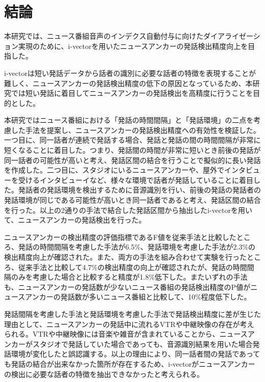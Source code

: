 \chapter{結論}
本研究では、ニュース番組音声のインデクス自動付与に向けたダイアライゼーション実現のために、i-vectorを用いたニュースアンカーの発話検出精度向上を目指した。\par

i-vectorは短い発話データから話者の識別に必要な話者の特徴を表現することが難しく、ニュースアンカーの発話検出精度の低下の原因となっているため、本研究では短い発話に着目してニュースアンカーの発話検出を高精度に行うことを目的とした。\par

本研究ではニュース番組における「発話の時間間隔」と「発話環境」の二点を考慮した手法を提案し、ニュースアンカーの発話検出精度への有効性を検証した。一つ目に、同一話者が連続で発話する場合、発話と発話の間の時間間隔が非常に短くなることに着目した。つまり、発話間の時間が非常に短いとき前後の発話が同一話者の可能性が高いと考え、発話区間の結合を行うことで擬似的に長い発話を作成した。二つ目に、スタジオにいるニュースアンカーや、屋外でインタビューを受けるインタビューイなど、様々な環境で話者が発話していることに着目した。発話者の発話環境を検出するために音源識別を行い、前後の発話の発話者の発話環境が同じである可能性が高いとき同一話者であると考え、発話区間の結合を行った。以上の2通りの手法で結合した発話区間から抽出したi-vectorを用いて、ニュースアンカーの発話検出を行った。\par

ニュースアンカーの検出精度の評価指標であるF値を従来手法と比較したところ、発話の時間間隔を考慮した手法が6.5\%、発話環境を考慮した手法が2.3\%の検出精度向上が確認された。また、両方の手法を組み合わせて実験を行ったところ、従来手法と比較して4.7\%の検出精度の向上が確認されたが、発話の時間間隔のみを考慮した場合と比較すると精度が1.8\%低下した。またいずれの手法も、ニュースアンカーの発話数が少ないニュース番組の発話検出精度のP値がニュースアンカーの発話数が多いニュース番組と比較して、10\%程度低下した。\par

発話間隔を考慮した手法と発話環境を考慮した手法で発話検出精度に差が生じた理由として、ニュースアンカーの発話中に流れるVTRや中継映像の存在が考えられる。VTRや中継映像には音楽や雑音が含まれていることから、ニュースアンカーがスタジオで発話していた場合であっても、音源識別結果を用いた場合発話環境が変化したと誤認識する。以上の理由により、同一話者間の発話であっても発話の結合が出来なかった箇所が存在するため、i-vectorがニュースアンカーの検出に必要な話者の特徴を抽出できなかったと考えられる。\par


